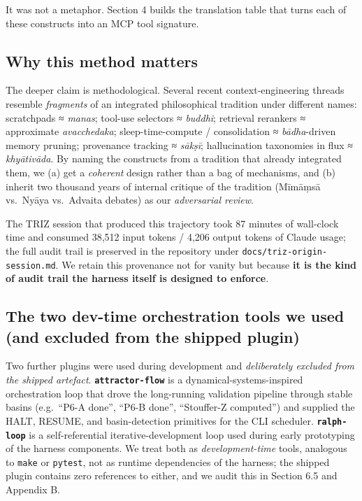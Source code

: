 It was not a metaphor. Section 4 builds the translation table that turns each of these constructs into an MCP tool signature.

\subsection{Why this method matters}\label{why-this-method-matters}

The deeper claim is methodological. Several recent context-engineering threads resemble \emph{fragments} of an integrated philosophical tradition under different names: scratchpads ≈ \emph{manas}; tool-use selectors ≈ \emph{buddhi}; retrieval rerankers ≈ approximate \emph{avacchedaka}; sleep-time-compute / consolidation ≈ \emph{bādha}-driven memory pruning; provenance tracking ≈ \emph{sākṣī}; hallucination taxonomies in flux ≈ \emph{khyātivāda}. By naming the constructs from a tradition that already integrated them, we (a) get a \emph{coherent} design rather than a bag of mechanisms, and (b) inherit two thousand years of internal critique of the tradition (Mīmāṃsā vs.~Nyāya vs.~Advaita debates) as our \emph{adversarial review}.

The TRIZ session that produced this trajectory took 87 minutes of wall-clock time and consumed 38,512 input tokens / 4,206 output tokens of Claude usage; the full audit trail is preserved in the repository under \passthrough{\lstinline!docs/triz-origin-session.md!}. We retain this provenance not for vanity but because \textbf{it is the kind of audit trail the harness itself is designed to enforce}.

\subsection{The two dev-time orchestration tools we used (and excluded from the shipped plugin)}\label{the-two-dev-time-orchestration-tools-we-used-and-excluded-from-the-shipped-plugin}

Two further plugins were used during development and \emph{deliberately excluded from the shipped artefact}. \textbf{\passthrough{\lstinline!attractor-flow!}} \citep{attractorflowplugin} is a dynamical-systems-inspired orchestration loop that drove the long-running validation pipeline through stable basins (e.g.~``P6-A done'', ``P6-B done'', ``Stouffer-Z computed'') and supplied the HALT, RESUME, and basin-detection primitives for the CLI scheduler. \textbf{\passthrough{\lstinline!ralph-loop!}} is a self-referential iterative-development loop used during early prototyping of the harness components. We treat both as \emph{development-time} tools, analogous to \passthrough{\lstinline!make!} or \passthrough{\lstinline!pytest!}, not as runtime dependencies of the harness; the shipped plugin contains zero references to either, and we audit this in Section 6.5 and Appendix B.
